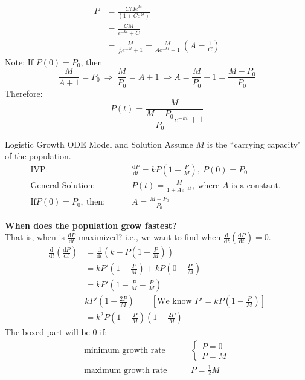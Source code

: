 \documentclass[12pt,a4paper]{article}
\def\d{{\mathrm{d}}}
\begin{document}
\begin{enumerate}
$$\begin{aligned}
		P&=\frac{CMe^{kt}}{\left(1+Ce^{kt}\right)}\\
		&=\frac{CM}{e^{-kt}+C}\\
		&=\frac{M}{\frac{1}{C}e^{-kt}+1}=\frac{M}{Ae^{-kt}+1}\ \left(A=\frac{1}{C}\right)
	\end{aligned}$$
	Note: If $P(0)=P_0$, then
	$$\frac{M}{A+1}=P_0\ \Rightarrow\ \frac{M}{P_0}=A+1\ \Rightarrow A=\frac{M}{P_0}-1=\frac{M-P_0}{P_0}$$
	Therefore: $$P(t)=\frac{M}{\dfrac{M-P_0}{P_0}e^{-kt}+1}$$
	\begin{thm}{Logistic Growth ODE Model and Solution}
		Assume $M$ is the ``carrying capacity" of the population. 
		$$\begin{aligned}
			\text{IVP: }&\qquad\frac{\d P}{\d t}=kP\left(1-\frac{P}{M}\right),\ P(0)=P_0\\
			\text{General Solution: }&\qquad P(t)=\frac{M}{1+Ae^{-kt}},\ \text{where }A\text{ is a constant. }\\
			\text{If} P(0)=P_0,\ \text{then: }&\qquad A=\frac{M-P_0}{P_0}
		\end{aligned}$$	
	\end{thm}
	\textbf{When does the population grow fastest? }\\
	That is, when is $\displaystyle\frac{\d P}{\d t}$ maximized? i.e., we want to find when $\displaystyle\frac{\d}{\d t}\left(\frac{\d P}{\d t}\right)=0$.
	$$\begin{aligned}
		\frac{\d}{\d t}\left(\frac{\d P}{\d t}\right)&=\frac{\d}{\d t}\left(k-P\left(1-\frac{P}{M}\right)\right)\\
		&=kP'\left(1-\frac{P}{M}\right)+kP\left(0-\frac{P'}{M}\right)\\
		&=kP'\left(1-\frac{P}{M}-\frac{P}{M}\right)\\
		&kP'\left(1-\frac{2P}{M}\right)\qquad\left[\text{We know }P'=kP\left(1-\frac{P}{M}\right)\right]\\
		&=k^2\boxed{P\left(1-\frac{P}{M}\right)\left(1-\frac{2P}{M}\right)}
	\end{aligned}$$
	The boxed part will be $0$ if: 
	$$\begin{aligned}
		\text{minimum growth rate}&\qquad\begin{cases}P=0\\ P=M\end{cases}\\
		\text{maximum growth rate}&\qquad P=\frac{1}{2}M
	\end{aligned}$$
\end{enumerate}
\end{document}

